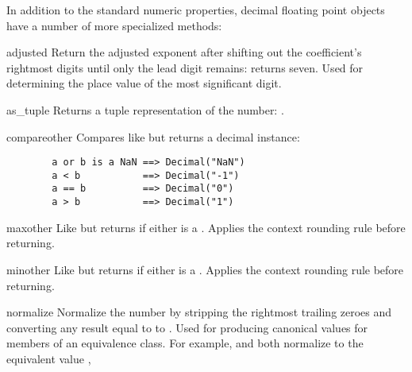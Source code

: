In addition to the standard numeric properties, decimal floating point objects
have a number of more specialized methods:

\begin{methoddesc}{adjusted}{}
  Return the adjusted exponent after shifting out the coefficient's rightmost
  digits until only the lead digit remains: 
  returns seven.  Used for determining the place value of the most significant
  digit.
\end{methoddesc}

\begin{methoddesc}{as_tuple}{}
  Returns a tuple representation of the number:
  .
\end{methoddesc}

\begin{methoddesc}{compare}{other}
  Compares like  but returns a decimal instance:
  \begin{verbatim}
        a or b is a NaN ==> Decimal("NaN")
        a < b           ==> Decimal("-1")
        a == b          ==> Decimal("0")
        a > b           ==> Decimal("1")
  \end{verbatim}
\end{methoddesc}

\begin{methoddesc}{max}{other}
  Like  but returns  if either is a
  .  Applies the context rounding rule before returning.
\end{methoddesc}

\begin{methoddesc}{min}{other}
  Like  but returns  if either is a
  .  Applies the context rounding rule before returning.
\end{methoddesc}

\begin{methoddesc}{normalize}{}
  Normalize the number by stripping the rightmost trailing zeroes and
  converting any result equal to  to
  . Used for producing canonical values for members
  of an equivalence class. For example,  and
   both normalize to the equivalent value
  ,
\end{methoddesc}                                              


